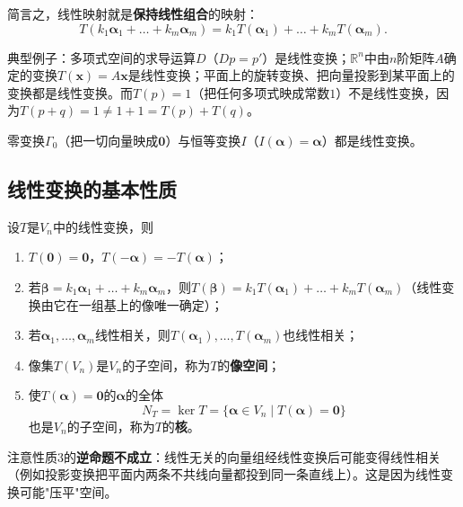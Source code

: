 简言之，线性映射就是\textbf{保持线性组合}的映射：
\[
T(k_1\boldsymbol{\alpha}_1+\dots+k_m\boldsymbol{\alpha}_m)=k_1T(\boldsymbol{\alpha}_1)+\dots+k_mT(\boldsymbol{\alpha}_m).
\]

典型例子：多项式空间的求导运算$D$（$Dp=p'$）是线性变换；$\mathbb{R}^{n}$中由$n$阶矩阵$A$确定的变换$T(\boldsymbol{x})=A\boldsymbol{x}$是线性变换；平面上的旋转变换、把向量投影到某平面上的变换都是线性变换。而$T(p)=1$（把任何多项式映成常数$1$）不是线性变换，因为$T(p+q)=1\ne1+1=T(p)+T(q)$。

零变换$\Gamma_0$（把一切向量映成$\boldsymbol{0}$）与恒等变换$I$（$I(\boldsymbol{\alpha})=\boldsymbol{\alpha}$）都是线性变换。

\subsection{线性变换的基本性质}
设$T$是$V_n$中的线性变换，则
\begin{enumerate}
    \item $T(\boldsymbol{0})=\boldsymbol{0}$，$T(-\boldsymbol{\alpha})=-T(\boldsymbol{\alpha})$；
    \item 若$\boldsymbol{\beta}=k_1\boldsymbol{\alpha}_1+\dots+k_m\boldsymbol{\alpha}_m$，则$T(\boldsymbol{\beta})=k_1T(\boldsymbol{\alpha}_1)+\dots+k_mT(\boldsymbol{\alpha}_m)$（线性变换由它在一组基上的像唯一确定）；
    \item 若$\boldsymbol{\alpha}_1,\dots,\boldsymbol{\alpha}_m$线性相关，则$T(\boldsymbol{\alpha}_1),\dots,T(\boldsymbol{\alpha}_m)$也线性相关；
    \item 像集$T(V_n)$是$V_n$的子空间，称为$T$的\textbf{像空间}；
    \item 使$T(\boldsymbol{\alpha})=\boldsymbol{0}$的$\boldsymbol{\alpha}$的全体
    \[
    N_T=\ker T=\{\boldsymbol{\alpha}\in V_n\mid T(\boldsymbol{\alpha})=\boldsymbol{0}\}
    \]
    也是$V_n$的子空间，称为$T$的\textbf{核}。
\end{enumerate}

注意性质3的\textbf{逆命题不成立}：线性无关的向量组经线性变换后可能变得线性相关（例如投影变换把平面内两条不共线向量都投到同一条直线上）。这是因为线性变换可能"压平"空间。


